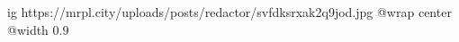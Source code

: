  
 
 
 
 

\ifcmt
  ig https://mrpl.city/uploads/posts/redactor/svfdksrxak2q9jod.jpg
  @wrap center
  @width 0.9
\fi
